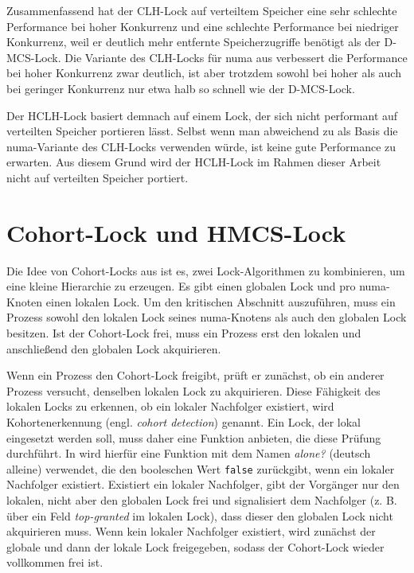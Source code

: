 Zusammenfassend hat der CLH-Lock auf verteiltem Speicher eine sehr schlechte Performance
bei hoher \gls{Konkurrenz} und eine schlechte Performance bei niedriger \gls{Konkurrenz},
weil er deutlich mehr entfernte Speicherzugriffe benötigt
als der D-MCS-Lock.
Die Variante des CLH-Locks für \gls{numa} aus \cite{C-Lock}
verbessert die Performance bei hoher \gls{Konkurrenz} zwar deutlich,
ist aber trotzdem sowohl bei hoher
als auch bei geringer \gls{Konkurrenz} nur etwa halb so schnell
wie der D-MCS-Lock.

Der HCLH-Lock basiert demnach auf einem Lock,
der sich nicht performant auf verteilten Speicher portieren lässt.
Selbst wenn man abweichend zu \cite{HCLH-Lock} als Basis die \gls{numa}-Variante des CLH-Locks verwenden würde,
ist keine gute Performance zu erwarten.
Aus diesem Grund wird der HCLH-Lock im Rahmen dieser Arbeit nicht auf verteilten Speicher portiert.

\section{Cohort-Lock und HMCS-Lock}
\label{sec:cohort-lock}

Die Idee von Cohort-Locks aus \cite{Cohort-Lock} ist es,
zwei Lock-Algorithmen zu kombinieren,
um eine kleine Hierarchie zu erzeugen.
Es gibt einen globalen Lock und pro \gls{numa}-Knoten einen lokalen Lock.
Um den kritischen Abschnitt auszuführen,
muss ein Prozess sowohl den lokalen Lock seines \gls{numa}-Knotens
als auch den globalen Lock besitzen.
Ist der Cohort-Lock frei,
muss ein Prozess erst den lokalen
und anschließend den globalen Lock akquirieren.

Wenn ein Prozess den Cohort-Lock freigibt,
prüft er zunächst,
ob ein anderer Prozess versucht,
denselben lokalen Lock zu akquirieren.
Diese Fähigkeit des lokalen Locks zu erkennen,
ob ein lokaler Nachfolger existiert,
wird Kohortenerkennung (engl. \textit{cohort detection}) genannt.
Ein Lock,
der lokal eingesetzt werden soll,
muss daher eine Funktion anbieten,
die diese Prüfung durchführt.
In \cite{Cohort-Lock} wird hierfür eine Funktion mit dem Namen \textit{alone?} (deutsch alleine) verwendet,
die den booleschen Wert \texttt{false} zurückgibt,
wenn ein lokaler Nachfolger existiert.
Existiert ein lokaler Nachfolger,
gibt der Vorgänger nur den lokalen,
nicht aber den globalen Lock frei
und signalisiert dem Nachfolger
(z. B. über ein Feld \textit{top-granted} im lokalen Lock),
dass dieser den globalen Lock nicht akquirieren muss.
Wenn kein lokaler Nachfolger existiert,
wird zunächst der globale und dann der lokale Lock freigegeben,
sodass der Cohort-Lock wieder vollkommen frei ist.

